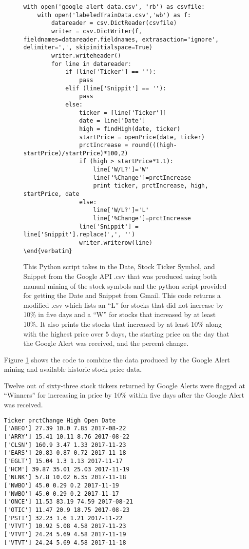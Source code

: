 \documentclass[sigconf]{acmart}
\begin{document}
\begin{figure}[htb]
\begin{lstlisting}
with open('google_alert_data.csv', 'rb') as csvfile:
	with open('labeledTrainData.csv','wb') as f:
		datareader = csv.DictReader(csvfile)
		writer = csv.DictWriter(f, fieldnames=datareader.fieldnames, extrasaction='ignore', delimiter=',', skipinitialspace=True)
		writer.writeheader()
		for line in datareader:
			if (line['Ticker'] == ''):
				pass
			elif (line['Snippit'] == ''):
				pass
			else:
				ticker = [line['Ticker']]
				date = line['Date']
				high = findHigh(date, ticker)
				startPrice = openPrice(date, ticker)
				prctIncrease = round(((high-startPrice)/startPrice)*100,2)
				if (high > startPrice*1.1):
					line['W/L?']='W'
					line['%Change']=prctIncrease
					print ticker, prctIncrease, high, startPrice, date
				else:
					line['W/L?']='L'
					line['%Change']=prctIncrease
				line['Snippit'] = line['Snippit'].replace(',', '')
				writer.writerow(line)
\end{verbatim}
\end{lstlisting}
\caption{This Python script takes in the Date, Stock Ticker Symbol, and Snippet from the Google API .csv that was produced using both manual mining of the stock symbols and the python script provided for getting the Date and Snippet from Gmail. This code returns a modified .csv which lists an ``L'' for stocks that did not increase by 10\% in five days and a ``W'' for stocks that increased by at least 10\%. It also prints the stocks that increased by at least 10\% along with the highest price over 5 days, the starting price on the day that the Google Alert was received, and the percent change.}\label{c:stock}
\end{figure}

Figure \ref{c:stock} shows the code to combine the data produced by the Google Alert mining and available historic stock price data.

Twelve out of sixty-three stock tickers returned by Google Alerts were flagged at ``Winners'' for increasing in price by 10\% within five days after the Google Alert was received. 
\begin{lstlisting}
Ticker prctChange High Open Date
['ABEO'] 27.39 10.0 7.85 2017-08-22
['ARRY'] 15.41 10.11 8.76 2017-08-22
['CLSN'] 160.9 3.47 1.33 2017-11-23
['EARS'] 20.83 0.87 0.72 2017-11-18
['EGLT'] 15.04 1.3 1.13 2017-11-17
['HCM'] 39.87 35.01 25.03 2017-11-19
['NLNK'] 57.8 10.02 6.35 2017-11-18
['NWBO'] 45.0 0.29 0.2 2017-11-19
['NWBO'] 45.0 0.29 0.2 2017-11-17
['ONCE'] 11.53 83.19 74.59 2017-08-21
['OTIC'] 11.47 20.9 18.75 2017-08-23
['PSTI'] 32.23 1.6 1.21 2017-11-22
['VTVT'] 10.92 5.08 4.58 2017-11-23
['VTVT'] 24.24 5.69 4.58 2017-11-19
['VTVT'] 24.24 5.69 4.58 2017-11-18
\end{lstlisting}
\end{document}
